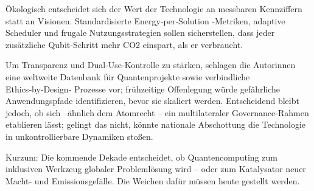 Ökologisch entscheidet sich der Wert der Technologie an messbaren Kennziffern statt an Visionen. Standardisierte Energy‑per‑Solution ‑Metriken, adaptive Scheduler und frugale Nutzungsstrategien sollen sicherstellen, dass jeder zusätzliche Qubit‑Schritt mehr CO2 einspart, als er verbraucht.

Um Transparenz und Dual‑Use‑Kontrolle zu stärken, schlagen die Autor\*innen eine weltweite Datenbank für Quantenprojekte sowie verbindliche Ethics‑by‑Design‑ Prozesse vor; frühzeitige Offenlegung würde gefährliche Anwendungspfade identifizieren, bevor sie skaliert werden. Entscheidend bleibt jedoch, ob sich –ähnlich dem Atomrecht – ein multilateraler Governance‑Rahmen etablieren lässt; gelingt das nicht, könnte nationale Abschottung die Technologie in unkontrollierbare Dynamiken stoßen.

Kurzum: Die kommende Dekade entscheidet, ob Quantencomputing zum inklusiven Werkzeug globaler Problemlösung wird – oder zum Katalysator neuer Macht‑ und Emissionsgefälle. Die Weichen dafür müssen heute gestellt werden.


\printbibliography








